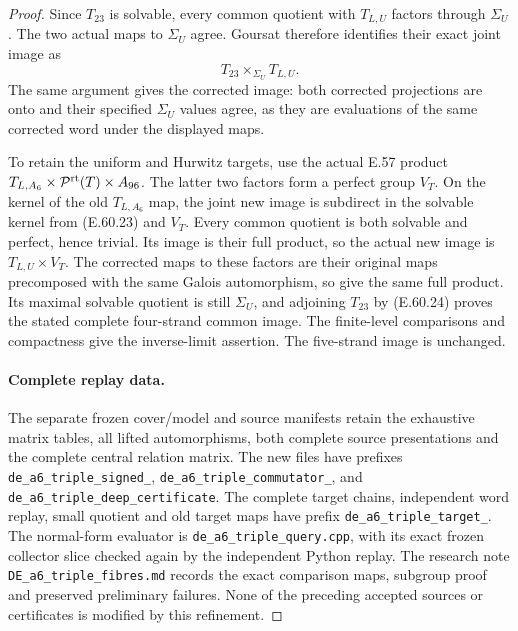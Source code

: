 \begin{proof}
Since $T_{23}$ is solvable, every common quotient
with $T_{L,U}$ factors through $\Sigma_U$.
The two actual maps to $\Sigma_U$ agree. Goursat
therefore identifies their exact joint image as
\[
                      T_{23}\times_{\Sigma_U}T_{L,U}.
 \tag{E.60.24}
\]
The same argument gives the corrected image: both
corrected projections are onto and their specified
$\Sigma_U$ values agree, as they are evaluations
of the same corrected word under the displayed maps.

To retain the uniform and Hurwitz targets, use
the actual E.57 product
$T_{L,A_6}\times\mathcal P^{\rm rt}(T)\times A_{96}$.
The latter two factors form a perfect group $V_T$.
On the kernel of the old $T_{L,A_6}$ map, the joint
new image is subdirect in the solvable kernel from
\textup{(E.60.23)} and $V_T$. Every common quotient
is both solvable and perfect, hence trivial.
Its image is their full product, so the actual
new image is $T_{L,U}\times V_T$.
The corrected maps to these factors are their
original maps precomposed with the same Galois
automorphism, so give the same full product.
Its maximal solvable quotient is still
$\Sigma_U$, and adjoining $T_{23}$ by
\textup{(E.60.24)} proves the stated complete
four-strand common image. The finite-level
comparisons and compactness give the inverse-limit
assertion. The five-strand image is unchanged.

\paragraph{Complete replay data.}
The separate frozen cover/model and source manifests
retain the exhaustive matrix tables, all lifted
automorphisms, both complete source presentations and
the complete central relation matrix.
The new files have prefixes
\texttt{de\_a6\_triple\_signed\_},
\texttt{de\_a6\_triple\_commutator\_}, and
\texttt{de\_a6\_triple\_deep\_certificate}.
The complete target chains, independent word replay,
small quotient and old target maps have prefix
\texttt{de\_a6\_triple\_target\_}.
The normal-form evaluator is
\texttt{de\_a6\_triple\_query.cpp}, with its exact
frozen collector slice checked again by the independent
Python replay. The research note
\texttt{DE\_a6\_triple\_fibres.md} records the exact
comparison maps, subgroup proof and preserved preliminary
failures. None of the preceding accepted sources or
certificates is modified by this refinement.
\end{proof}
